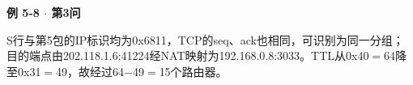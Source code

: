{\color{ink}\bfseries 例 5-8 \(\cdot \) 第3问}\par\vspace{1bp}S行与第5包的IP标识均为0x6811，TCP的seq、ack也相同，可识别为同一分组；目的端点由202.118.1.6:41224经NAT映射为192.168.0.8:3033。TTL从0x40\(=\allowbreak{}\)64降至0x31\(=\allowbreak{}\)49，故经过64\(-\)49\(=\allowbreak{}\)15个路由器。
